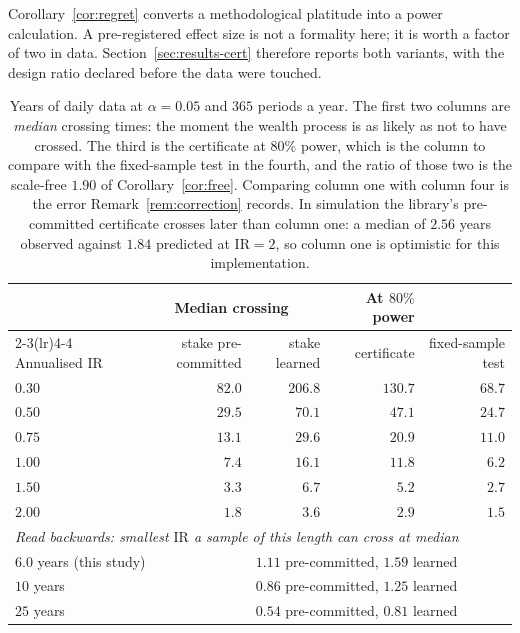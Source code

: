 \documentclass{article}
\theoremstyle{plain}
\theoremstyle{definition}
\begin{document}
Corollary~\ref{cor:regret} converts a methodological platitude into a power calculation. A
pre-registered effect size is not a formality here; it is worth a factor of two in data.
Section~\ref{sec:results-cert} therefore reports both variants, with the design ratio
declared before the data were touched.

\begin{table}[t]
  \centering
  \caption{Years of daily data at $\alpha=0.05$ and $365$ periods a year. The first two
  columns are \emph{median} crossing times: the moment the wealth process is as likely as not
  to have crossed. The third is the certificate at $80\%$ power, which is the column to
  compare with the fixed-sample test in the fourth, and the ratio of those two is the
  scale-free $1.90$ of Corollary~\ref{cor:free}. Comparing column one with column four is the
  error Remark~\ref{rem:correction} records. In simulation the library's pre-committed
  certificate crosses later than column one: a median of $2.56$ years observed against $1.84$
  predicted at $\mathrm{IR}=2$, so column one is optimistic for this implementation.}
  \label{tab:horizon}
  \small
  \begin{tabular}{lrrrr}
    \toprule
    & \multicolumn{2}{c}{Median crossing} & At $80\%$ power & \\
    \cmidrule(lr){2-3}\cmidrule(lr){4-4}
    Annualised $\mathrm{IR}$ & stake pre-committed & stake learned
      & certificate & fixed-sample test \\
    \midrule
    $0.30$ & $82.0$ & $206.8$ & $130.7$ & $68.7$ \\
    $0.50$ & $29.5$ & $70.1$  & $47.1$  & $24.7$ \\
    $0.75$ & $13.1$ & $29.6$  & $20.9$  & $11.0$ \\
    $1.00$ & $7.4$  & $16.1$  & $11.8$  & $6.2$  \\
    $1.50$ & $3.3$  & $6.7$   & $5.2$   & $2.7$  \\
    $2.00$ & $1.8$  & $3.6$   & $2.9$   & $1.5$  \\
    \midrule
    \multicolumn{5}{l}{\emph{Read backwards: smallest $\mathrm{IR}$ a sample of this length can cross at median}} \\
    \multicolumn{2}{l}{$6.0$ years (this study)} & \multicolumn{3}{l}{$1.11$ pre-committed, $1.59$ learned} \\
    \multicolumn{2}{l}{$10$ years}               & \multicolumn{3}{l}{$0.86$ pre-committed, $1.25$ learned} \\
    \multicolumn{2}{l}{$25$ years}               & \multicolumn{3}{l}{$0.54$ pre-committed, $0.81$ learned} \\
    \bottomrule
  \end{tabular}
\end{table}
\end{document}
